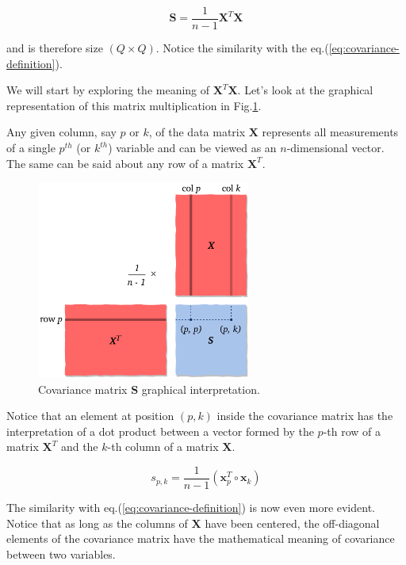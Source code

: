 \documentclass[10pt,twocolumn]{article}
\begin{document}
\begin{equation}\label{eq:cov-matrix}
\bm{S} = \frac{1}{n-1} \bm{X}^T \bm{X}
\end{equation}

and is therefore size $(Q \times Q)$. Notice the similarity with the eq.(\ref{eq:covariance-definition}).

We will start by exploring the meaning of $\bm{X}^T \bm{X}$. Let's look at the graphical representation of this matrix multiplication in Fig.\ref{fig:covariance-matrix}.

Any given column, say $p$ or $k$, of the data matrix $\bm{X}$ represents all measurements of a single $p^{th}$ (or $k^{th}$) variable and can be viewed as an $n$-dimensional vector. The same can be said about any row of a matrix $\bm{X}^T$.

\begin{figure}[H]
\centering\includegraphics[width=7cm]{cov-matrix.png}
\caption{Covariance matrix $\bm{S}$ graphical interpretation.}
\label{fig:covariance-matrix}
\end{figure}

Notice that an element at position $(p,k)$ inside the covariance matrix has the interpretation of a dot product between a vector formed by the $p$-th row of a matrix $\bm{X}^T$ and the $k$-th column of a matrix $\bm{X}$.

\begin{equation}
s_{p,k} = \frac{1}{n-1} (\bm{x}_p^T \circ \bm{x}_k)
\end{equation}

The similarity with eq.(\ref{eq:covariance-definition}) is now even more evident. Notice that as long as the columns of $\bm{X}$ have been centered, the off-diagonal elements of the covariance matrix have the mathematical meaning of covariance between two variables.
\end{document}
